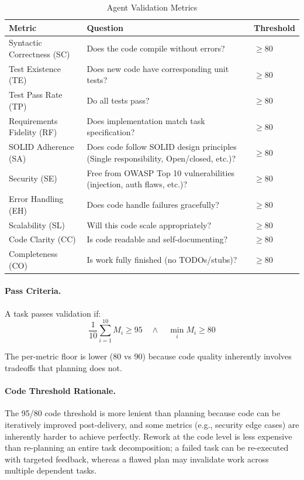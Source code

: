 \begin{table}[htbp]
\centering
\caption{Agent Validation Metrics}
\label{tab:code-metrics}
\small
\begin{tabular}{lp{6cm}l}
\toprule
\textbf{Metric} & \textbf{Question} & \textbf{Threshold} \\
\midrule
Syntactic Correctness (SC) & Does the code compile without errors? & $\geq$80 \\
Test Existence (TE) & Does new code have corresponding unit tests? & $\geq$80 \\
Test Pass Rate (TP) & Do all tests pass? & $\geq$80 \\
Requirements Fidelity (RF) & Does implementation match task specification? & $\geq$80 \\
SOLID Adherence (SA) & Does code follow SOLID design principles (Single responsibility, Open/closed, etc.)? & $\geq$80 \\
Security (SE) & Free from OWASP Top 10 vulnerabilities (injection, auth flaws, etc.)? & $\geq$80 \\
Error Handling (EH) & Does code handle failures gracefully? & $\geq$80 \\
Scalability (SL) & Will this code scale appropriately? & $\geq$80 \\
Code Clarity (CC) & Is code readable and self-documenting? & $\geq$80 \\
Completeness (CO) & Is work fully finished (no TODOs/stubs)? & $\geq$80 \\
\bottomrule
\end{tabular}
\end{table}

\paragraph{Pass Criteria.}
A task passes validation if:
\begin{equation}
\frac{1}{10}\sum_{i=1}^{10} M_i \geq 95 \quad \land \quad \min_i M_i \geq 80
\end{equation}

The per-metric floor is lower (80 vs 90) because code quality inherently
involves tradeoffs that planning does not.

\paragraph{Code Threshold Rationale.}
The 95/80 code threshold is more lenient than planning because code can be
iteratively improved post-delivery, and some metrics (e.g., security edge
cases) are inherently harder to achieve perfectly. Rework at the code level
is less expensive than re-planning an entire task decomposition; a failed
task can be re-executed with targeted feedback, whereas a flawed plan may
invalidate work across multiple dependent tasks.


